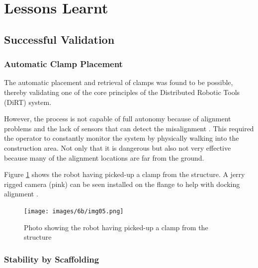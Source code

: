 \FloatBarrier

\section{Lessons Learnt}
\label{section:exploration-3-lessons-learnt}

\subsection{Successful Validation}
\label{subsection:exploration-3-successful-validation}

\subsubsection{Automatic Clamp Placement}
\label{subsubsection:exploration-3-automatic-clamp-placement}

The automatic placement and retrieval of clamps was found to be possible, thereby validating one of the core principles of the Distributed Robotic Tools (DiRT) system. 

However, the process is not capable of full autonomy because of alignment problems and the lack of sensors that can detect the misalignment . This required the operator to constantly monitor the system by physically walking into the construction area. Not only that it is dangerous but also not very effective because many of the alignment locations are far from the ground. 

Figure \ref{fig:robot-picking-up-clamp} shows the robot having picked-up a clamp from the structure. A jerry rigged camera (pink) can be seen installed on the flange to help with docking alignment . 

\begin{figure}[!h]
    \centering
    \texttt{[image: images/6b/img05.png]}
    \caption{Photo showing the robot having picked-up a clamp from the structure}
    \label{fig:robot-picking-up-clamp}
\end{figure}


\subsubsection{Stability by Scaffolding}
\label{subsubsection:exploration-3-stability-by-scaffolding}

